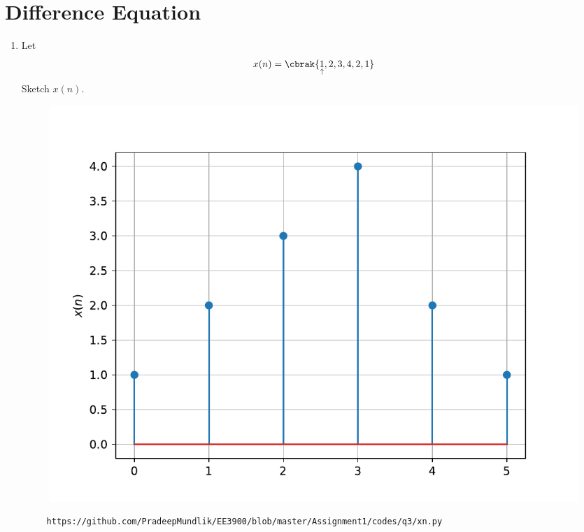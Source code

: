 \documentclass[journal,12pt,twocolumn]{IEEEtran}
\renewcommand\thesection{\arabic{section}}
\begin{document}
\section{Difference Equation}
\begin{enumerate}[label=\thesection.\arabic*,ref=\thesection.\theenumi]
\item Let
\begin{equation}
x(n) = \cbrak{\underset{\uparrow}{1},2,3,4,2,1}
\end{equation}
Sketch $x(n)$. \\
\solution 

\begin{figure}[!ht]
\begin{center}
\includegraphics[width=\columnwidth]{figs/q3/xn.pdf}
\end{center}
\label{fig:xn}	
\end{figure}
\begin{lstlisting}
     https://github.com/PradeepMundlik/EE3900/blob/master/Assignment1/codes/q3/xn.py
\end{lstlisting}


\end{enumerate}
\end{document}
